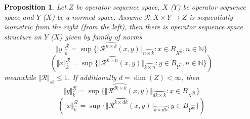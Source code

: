 \documentclass[12pt]{article}
\newtheorem{proposition}[theorem]{Proposition}
\begin{document}
\begin{proposition}\label{PrSQNormViaDuality}
Let $Z$ be operator sequence space, $X$ ($Y$) be operator sequence space and $Y$ ($X$) be a normed space. Assume $\mathcal{R}:X\times Y\to Z$ is sequentially isometric from the right (from the left), then 
there is operator sequence space structure on $Y$ ($X$) given by family of norms
$$
\Vert y\Vert_{\wideparen{k}}^{\mathcal{R}}=\sup\{\Vert\mathcal{R}^{\wideparen{n\times k}}(x,y)\Vert_{\wideparen{n\times k}}:x\in B_{X^{\wideparen{n}}}, n\in\mathbb{N}\}
$$
$$
(\Vert x\Vert_{\wideparen{k}}^{\mathcal{R}}=\sup\{\Vert\mathcal{R}^{\wideparen{k\times n}}(x,y)\Vert_{\wideparen{k\times n}}:y\in B_{Y^{\wideparen{n}}}, n\in\mathbb{N}\})
$$
meanwhile $\Vert \mathcal{R}\Vert_{sb}\leq 1$. If additionally $d=\operatorname{dim}(Z)<\infty$, then
$$
\Vert y\Vert_{\wideparen{k}}^{\mathcal{R}}=\sup\{\Vert\mathcal{R}^{\wideparen{dk\times k}}(x,y)\Vert_{\wideparen{dk\times k}}:x\in B_{X^{\wideparen{dk}}}\}
$$
$$
(\Vert x\Vert_{\wideparen{k}}^{\mathcal{R}}=\sup\{\Vert\mathcal{R}^{\wideparen{k\times dk}}(x,y)\Vert_{\wideparen{k\times dk}}:y\in B_{Y^{\wideparen{dk}}}\})
$$
\end{proposition}
\end{document}

